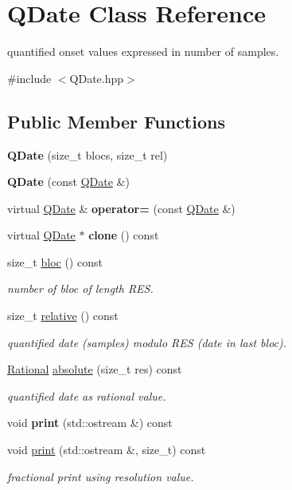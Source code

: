 \hypertarget{classQDate}{}\section{Q\+Date Class Reference}
\label{classQDate}


quantified onset values expressed in number of samples.  




{\ttfamily \#include $<$Q\+Date.\+hpp$>$}

\subsection*{Public Member Functions}
\begin{DoxyCompactItemize}
\item 
{\bfseries Q\+Date} (size\+\_\+t blocs, size\+\_\+t rel)
\item 
{\bfseries Q\+Date} (const \mbox{\hyperlink{classQDate}{Q\+Date}} \&)
\item 
virtual \mbox{\hyperlink{classQDate}{Q\+Date}} \& {\bfseries operator=} (const \mbox{\hyperlink{classQDate}{Q\+Date}} \&)
\item 
virtual \mbox{\hyperlink{classQDate}{Q\+Date}} $\ast$ {\bfseries clone} () const
\item 
\mbox{\label{classQDate_a5583b42d333739ef0432446d73400320}} 
size\+\_\+t \mbox{\hyperlink{classQDate_a5583b42d333739ef0432446d73400320}{bloc}} () const
\begin{DoxyCompactList}\small\item\em number of bloc of length R\+ES. \end{DoxyCompactList}\item 
\mbox{\label{classQDate_ad531ed61e0c9a207a1016af4b0245d46}} 
size\+\_\+t \mbox{\hyperlink{classQDate_ad531ed61e0c9a207a1016af4b0245d46}{relative}} () const
\begin{DoxyCompactList}\small\item\em quantified date (samples) modulo R\+ES (date in last bloc). \end{DoxyCompactList}\item 
\mbox{\hyperlink{classRational}{Rational}} \mbox{\hyperlink{group__output_ga07a4414576afc26204002ce92dcc7ce9}{absolute}} (size\+\_\+t res) const
\begin{DoxyCompactList}\small\item\em quantified date as rational value. \end{DoxyCompactList}\item 
void {\bfseries print} (std\+::ostream \&) const
\item 
void \mbox{\hyperlink{group__output_gaf69eee7904ee41d76e3a1a61ab92cfd1}{print}} (std\+::ostream \&, size\+\_\+t) const
\begin{DoxyCompactList}\small\item\em fractional print using resolution value. \end{DoxyCompactList}\end{DoxyCompactItemize}
